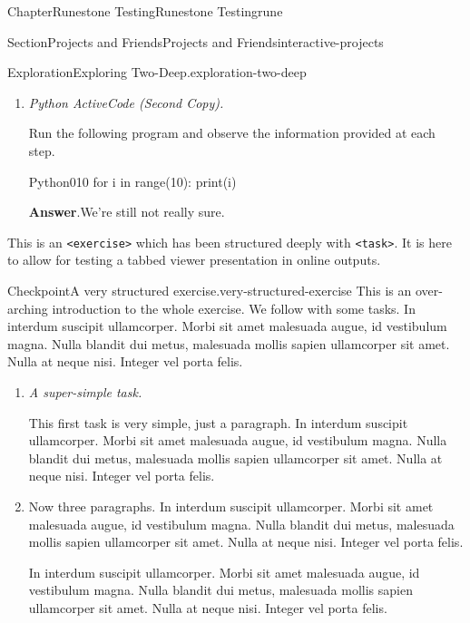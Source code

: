 \documentclass[oneside,10pt,]{book}
\newcommand{\blocktitlefont}{\relax}
\newcommand{\mono}[1]{\texttt{#1}}
\newcommand{\lititle}[1]{{\slshape#1}}
\numberwithin{equation}{section}
\begin{document}
\begin{chapterptx}{Chapter}{Runestone Testing}{}{Runestone Testing}{}{}{rune}
\begin{sectionptx}{Section}{Projects and Friends}{}{Projects and Friends}{}{}{interactive-projects}
\begin{exploration}{Exploration}{Exploring Two-Deep.}{exploration-two-deep}
\begin{enumerate}[font=\bfseries,label=(\alph*),ref=\alph*]
\begin{enumerate}[font=\bfseries,label=(\roman*),ref=\theenumi.\roman*]
\begin{enumerate}[label={\Alph*.}]
Red is universally used for prohibited activities or serious warnings.%
\item{}\lititle{Incorrect.}\par%
White might be hard to see.%
\end{enumerate}
%
\item{}\lititle{Python ActiveCode (Second Copy).}\par%
Run the following program and observe the information provided at each step.%
\begin{program}{Python}{0}{1}{0}
for i in range(10):
    print(i)
\end{program}
\par\smallskip%
\noindent\textbf{\blocktitlefont Answer}.\hypertarget{task-active-code-second-3}{}\quad{}We're still not really sure.%
\end{enumerate}%
\end{enumerate}%
\end{exploration}%
This is an \mono{<exercise>} which has been structured deeply with \mono{<task>}.  It is here to allow for testing a tabbed viewer presentation in online outputs.%
\begin{inlineexercise}{Checkpoint}{A very structured exercise.}{very-structured-exercise}%
This is an over-arching introduction to the whole exercise.  We follow with some tasks.  In interdum suscipit ullamcorper. Morbi sit amet malesuada augue, id vestibulum magna. Nulla blandit dui metus, malesuada mollis sapien ullamcorper sit amet. Nulla at neque nisi. Integer vel porta felis.%
\begin{enumerate}[font=\bfseries,label=(\alph*),ref=\alph*]%
\item{}\lititle{A super-simple task.}\par%
This first task is very simple, just a paragraph.  In interdum suscipit ullamcorper. Morbi sit amet malesuada augue, id vestibulum magna. Nulla blandit dui metus, malesuada mollis sapien ullamcorper sit amet. Nulla at neque nisi. Integer vel porta felis.%
\item{}Now three paragraphs.  In interdum suscipit ullamcorper. Morbi sit amet malesuada augue, id vestibulum magna. Nulla blandit dui metus, malesuada mollis sapien ullamcorper sit amet. Nulla at neque nisi. Integer vel porta felis.%
\par
In interdum suscipit ullamcorper. Morbi sit amet malesuada augue, id vestibulum magna. Nulla blandit dui metus, malesuada mollis sapien ullamcorper sit amet. Nulla at neque nisi. Integer vel porta felis.%
\par

\end{enumerate}
\end{inlineexercise}
\end{sectionptx}
\end{chapterptx}
\end{document}
